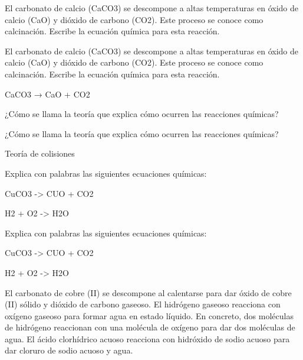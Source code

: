 \begin{exercise}
    El carbonato de calcio (CaCO3) se descompone a
    altas temperaturas en óxido de calcio (CaO) y
    dióxido de carbono (CO2). Este proceso se conoce como
    calcinación. Escribe la ecuación química para esta
    reacción.
    \begin{solu}{}
         El carbonato de calcio (CaCO3) se descompone a altas temperaturas en óxido de calcio (CaO) y dióxido de carbono (CO2). Este proceso se conoce como calcinación. Escribe la ecuación química para esta reacción.

        \begin{reaction*}
            CaCO3\sld{} → CaO\sld{} + CO2\gas{}
        \end{reaction*}
    \end{solu}
\end{exercise}

\begin{exercise}
    ¿Cómo se llama la teoría que explica cómo ocurren las reacciones químicas?
    \begin{solu}{}
         ¿Cómo se llama la teoría que explica cómo ocurren las reacciones químicas?

        Teoría de colisiones
    \end{solu}
\end{exercise}

\begin{exercise}
    Explica con palabras las siguientes ecuaciones químicas:
    \begin{reaction*}
        CuCO3\sld{} -> CUO\sld{} + CO2\gas{}
    \end{reaction*}
    \begin{reaction*}
        H2\gas{} + O2\gas{} ->  H2O\lqd{}
    \end{reaction*}
    \begin{solu}
         Explica con palabras las siguientes ecuaciones químicas:
    \begin{reaction*}
        CuCO3\sld{} -> CUO\sld{} + CO2\gas{}
    \end{reaction*}
    \begin{reaction*}
        H2\gas{} + O2\gas{} ->  H2O\lqd{}
    \end{reaction*}


        El carbonato de cobre (II) se descompone al calentarse
        para dar óxido de cobre (II) sólido y dióxido de
        carbono gaseoso.
        El hidrógeno gaseoso reacciona con oxígeno gaseoso
        para formar agua en estado líquido. En concreto, dos
        moléculas de hidrógeno reaccionan con una molécula de
        oxígeno para dar
        dos moléculas de agua.
        El ácido clorhídrico acuoso reacciona con hidróxido
        de sodio acuoso para dar cloruro de sodio acuoso
        y agua.
    \end{solu}
\end{exercise}


